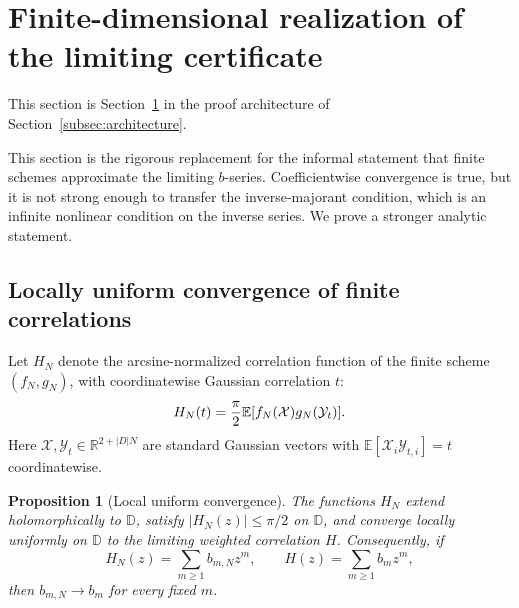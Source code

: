 \documentclass[11pt]{article}
\newcommand{\R}{\mathbb R}
\newcommand{\D}{\mathbb D}
\newcommand{\E}{\mathbb E}
\newcommand{\1}{\mathbf 1}
\theoremstyle{plain}
\newtheorem{proposition}[theorem]{Proposition}
\theoremstyle{definition}
\theoremstyle{remark}
\begin{document}
\section{Finite-dimensional realization of the limiting certificate}\label{sec:transfer}

This section is Section~\ref{sec:transfer} in the proof architecture of Section~\ref{subsec:architecture}.

This section is the rigorous replacement for the informal statement that finite schemes approximate the limiting \(b\)-series.  Coefficientwise convergence is true, but it is not strong enough to transfer the inverse-majorant condition, which is an infinite nonlinear condition on the inverse series.  We prove a stronger analytic statement.

\subsection{Locally uniform convergence of finite correlations}

Let \(H_N\) denote the arcsine-normalized correlation function of the finite scheme \((f_N,g_N)\), with coordinatewise Gaussian correlation \(t\):
\[
  H_N(t)={\pi\over2}\E[f_N(\mathcal X)g_N(\mathcal Y_t)].
\]
Here \(\mathcal X,\mathcal Y_t\in\R^{2+|D|N}\) are standard Gaussian vectors with \(\E[\mathcal X_i\mathcal Y_{t,i}]=t\) coordinatewise.

\begin{proposition}[Local uniform convergence]\label{prop:loc-unif}
The functions \(H_N\) extend holomorphically to \(\D\), satisfy \(|H_N(z)|\le\pi/2\) on \(\D\), and converge locally uniformly on \(\D\) to the limiting weighted correlation \(H\).  Consequently, if
\[
  H_N(z)=\sum_{m\ge1}b_{m,N}z^m,
  \qquad
  H(z)=\sum_{m\ge1}b_mz^m,
\]
then \(b_{m,N}\to b_m\) for every fixed \(m\).
\end{proposition}
\end{document}
